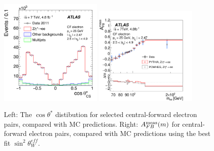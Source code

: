 \begin{figure}[p]
    \centering
    \includegraphics[width=0.45\textwidth]{figures/ss-precision-afb-atlas-cf-ct.pdf}
    \includegraphics[width=0.45\textwidth]{figures/ss-precision-afb-atlas-cf-afb.pdf}
    \caption{
    Left: The $\cos\theta^*$ distibution for selected central-forward electron pairs, compared with MC predictions.
    Right: $A^{\rm meas}_{FB}(m)$ for central-forward electron pairs, compared with MC predictions using the best fit $\sin^2\theta^{eff}_{W}$.}
    \label{fig:ss-precision-afb-atlas-cf}
\end{figure}


